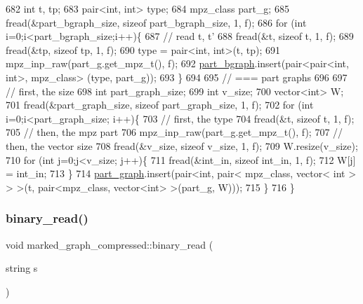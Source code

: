 \begin{DoxyCode}
682   \textcolor{keywordtype}{int} t, tp;
683   pair<int, int> type; 
684   mpz\_class part\_g; 
685   fread(&part\_bgraph\_size, \textcolor{keyword}{sizeof} part\_bgraph\_size, 1, f);
686   \textcolor{keywordflow}{for} (\textcolor{keywordtype}{int} i=0;i<part\_bgraph\_size;i++)\{
687     \textcolor{comment}{// read t, t'}
688     fread(&t, \textcolor{keyword}{sizeof} t, 1, f);
689     fread(&tp, \textcolor{keyword}{sizeof} tp, 1, f);
690     type = pair<int, int>(t, tp);
691     mpz\_inp\_raw(part\_g.get\_mpz\_t(), f);
692     \hyperlink{classmarked__graph__compressed_a7b3267063fba30b45eb21b3ba4e07536}{part\_bgraph}.insert(pair<pair<int, int>, mpz\_class> (type, part\_g));
693   \}
694 
695   \textcolor{comment}{// === part graphs}
696 
697   \textcolor{comment}{// first, the size}
698   \textcolor{keywordtype}{int} part\_graph\_size;
699   \textcolor{keywordtype}{int} v\_size;
700   vector<int> W; 
701   fread(&part\_graph\_size, \textcolor{keyword}{sizeof} part\_graph\_size, 1, f);
702   \textcolor{keywordflow}{for} (\textcolor{keywordtype}{int} i=0;i<part\_graph\_size; i++)\{
703     \textcolor{comment}{// first, the type}
704     fread(&t, \textcolor{keyword}{sizeof} t, 1, f);
705     \textcolor{comment}{// then, the mpz part}
706     mpz\_inp\_raw(part\_g.get\_mpz\_t(), f);
707     \textcolor{comment}{// then, the vector size}
708     fread(&v\_size, \textcolor{keyword}{sizeof} v\_size, 1, f);
709     W.resize(v\_size);
710     \textcolor{keywordflow}{for} (\textcolor{keywordtype}{int} j=0;j<v\_size; j++)\{
711       fread(&int\_in, \textcolor{keyword}{sizeof} int\_in, 1, f);
712       W[j] = int\_in;
713     \}
714     \hyperlink{classmarked__graph__compressed_ae179a4737e6eab905c18a94d44ef64b7}{part\_graph}.insert(pair<\textcolor{keywordtype}{int}, pair< mpz\_class, vector< int > > >(t, pair<mpz\_class, vector<int>
       >(part\_g, W)));
715   \}
716 \}
\end{DoxyCode}
\mbox{\label{classmarked__graph__compressed_a01c67fe4234738db6bb60459515c3ad8}} 
\subsubsection{\texorpdfstring{binary\+\_\+read()}{binary\_read()}\hspace{0.1cm}{\footnotesize\ttfamily [2/2]}}
{\footnotesize\ttfamily void marked\+\_\+graph\+\_\+compressed\+::binary\+\_\+read (\begin{DoxyParamCaption}\item[{string}]{s }\end{DoxyParamCaption})}

